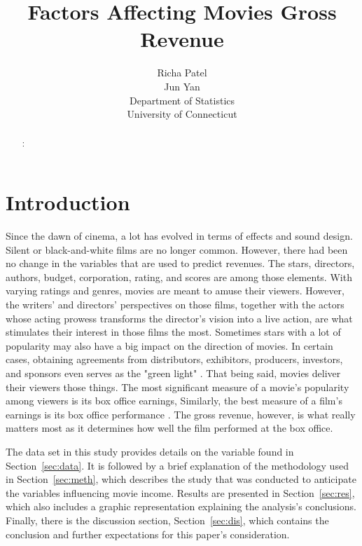 \documentclass[12pt]{article}
\title{Factors Affecting Movies Gross Revenue}
\author{Richa Patel\\
  Jun Yan\\[2ex]
  Department of Statistics\\
  University of Connecticut\\
}
\begin{document}
\maketitle
\doublespace

\begin{abstract}


\bigskip
{}:
  

\end{abstract}


\section{Introduction}
\label{sec:intro}

Since the dawn of cinema, a lot has evolved in terms of effects and sound design. 
Silent or black-and-white films are no longer common. However, there had been no
change in the variables that are used to predict revenues. The stars, directors,
authors, budget, corporation, rating, and scores are among those elements. With 
varying ratings and genres, movies are meant to amuse their viewers. However, 
the writers' and directors' perspectives on those films, together with the actors 
whose acting prowess transforms the director's vision into a live action, are what 
stimulates their interest in those films the most. Sometimes stars with a lot of 
popularity may also have a big impact on the direction of movies. In certain cases,
obtaining agreements from distributors, exhibitors, producers, investors, and sponsors 
even serves as the "green light" \citep{4}. That being said, movies deliver their 
viewers those things. The most significant measure of a movie's popularity among viewers
is its box office earnings, Similarly, the best measure of a film's earnings is its box 
office performance \citep{1}. The gross revenue, however, is what really matters most as it 
determines how well the film performed at the box office.

The data set in this study provides details on the variable found in Section~\ref{sec:data}. 
It is followed by a brief explanation of the methodology used in Section~\ref{sec:meth}, 
which describes the study that was conducted to anticipate the variables influencing movie 
income. Results are presented in Section~\ref{sec:res}, which also includes a graphic representation
explaining the analysis's conclusions. Finally, there is the discussion section, 
Section~\ref{sec:dis}, which contains the conclusion and further expectations for this
paper's consideration.
\end{document}
